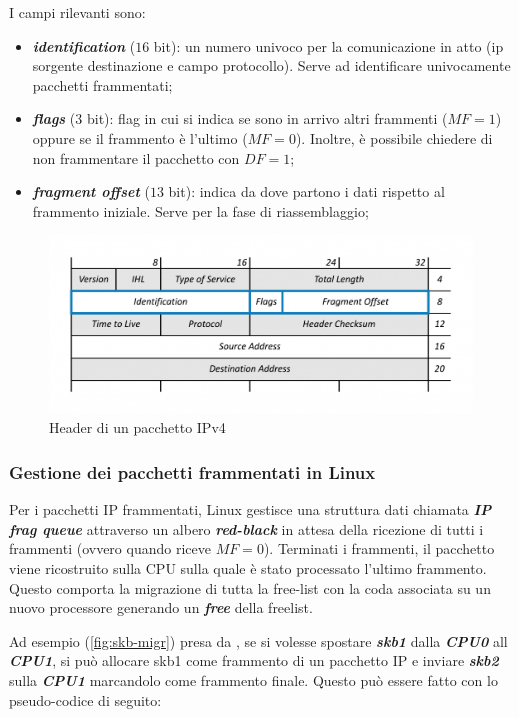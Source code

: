 \documentclass{article}
\begin{document}
I campi rilevanti sono:
\begin{itemize}
  \item \textbf{\textit{identification}} ($16$ bit): un numero univoco per la comunicazione in atto (ip sorgente 
    destinazione e campo protocollo). Serve ad identificare univocamente pacchetti frammentati;
  \item \textbf{\textit{flags}} ($3$ bit): flag in cui si indica se sono in arrivo altri frammenti ($MF=1$) oppure 
    se il frammento è l'ultimo ($MF=0$). Inoltre, è possibile chiedere di non frammentare il 
    pacchetto con $DF=1$;
  \item \textbf{\textit{fragment offset}} ($13$ bit): indica da dove partono i dati rispetto 
    al frammento iniziale. Serve per la fase di riassemblaggio;
\end{itemize}

\begin{figure}[h]
  \begin{center}
    \includegraphics[width=.75\textwidth]{figures/ch1/IPv4-Headers-Standard-Fragmentation-Highlighted-1024x431.png}
  \end{center}
  \caption{Header di un pacchetto IPv4}\label{fig:ipv4-header}
\end{figure}

\subsubsection{Gestione dei pacchetti frammentati in Linux}
Per i pacchetti IP frammentati, Linux gestisce una struttura dati chiamata \textbf{\textit{IP 
frag queue}} attraverso un albero \textbf{\textit{red-black}} in attesa della ricezione di tutti 
i frammenti (ovvero quando riceve $MF = 0$). Terminati i frammenti, il pacchetto viene 
ricostruito sulla CPU sulla quale è stato processato l'ultimo frammento. Questo comporta 
la migrazione di tutta la free-list con la coda associata su un nuovo processore 
generando un \textbf{\textit{free}} della freelist. 

Ad esempio (\cref{fig:skb-migr}) presa da \cite{NetfilterTablesVulnerability}, se si volesse spostare \textbf{\textit{skb1}} dalla \textbf{\textit{CPU0}} all 
\textbf{\textit{CPU1}}, si può allocare skb1 come frammento di un pacchetto IP e inviare 
\textbf{\textit{skb2}} sulla \textbf{\textit{CPU1}} marcandolo come frammento finale. 
Questo può essere fatto con lo pseudo-codice di seguito:
\end{document}
